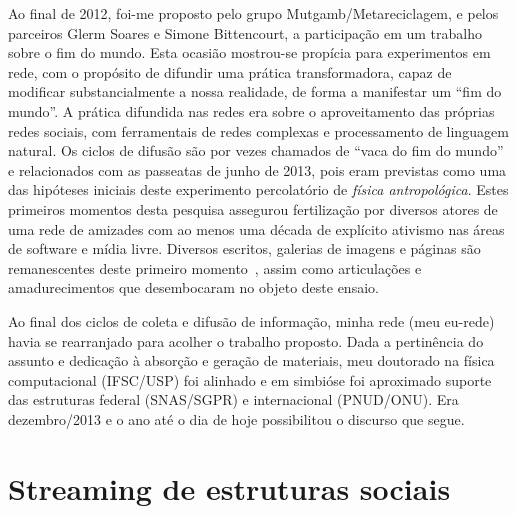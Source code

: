 \documentclass[a4paper, 11pt]{article} %
\begin{document}
Ao final de 2012, foi-me proposto pelo grupo Mutgamb/Metareciclagem, e pelos parceiros Glerm Soares e Simone Bittencourt, a participação  em um trabalho sobre o fim do mundo. Esta ocasião mostrou-se propícia para experimentos em rede, com o propósito de difundir uma prática transformadora, capaz de modificar substancialmente a nossa realidade, de forma a manifestar um ``fim do mundo''. A prática difundida nas redes era sobre o aproveitamento das próprias redes sociais, com ferramentais de redes complexas e processamento de linguagem natural. Os ciclos de difusão são por vezes chamados de ``vaca do fim do mundo'' e relacionados com as passeatas de junho de 2013, pois eram previstas como uma das hipóteses iniciais deste experimento percolatório de \emph{física antropológica}. Estes primeiros momentos desta pesquisa assegurou fertilização por diversos atores de uma rede de amizades com ao menos uma década de explícito ativismo nas áreas de software e mídia livre. Diversos escritos, galerias de imagens e páginas são remanescentes deste primeiro momento~\cite{ciberiun,ars,rc1,rc2}, assim como articulações e amadurecimentos que desembocaram no objeto deste ensaio.

Ao final dos ciclos de coleta e difusão de informação, minha rede (meu eu-rede) havia se rearranjado para acolher o trabalho proposto. Dada a pertinência do assunto e dedicação à absorção e geração de materiais, meu doutorado na física computacional (IFSC/USP) foi alinhado e em simbióse foi aproximado suporte das estruturas federal (SNAS/SGPR) e internacional (PNUD/ONU). Era dezembro/2013 e o ano até o dia de hoje possibilitou o discurso que segue.



\section*{Streaming de estruturas sociais}
\end{document}
